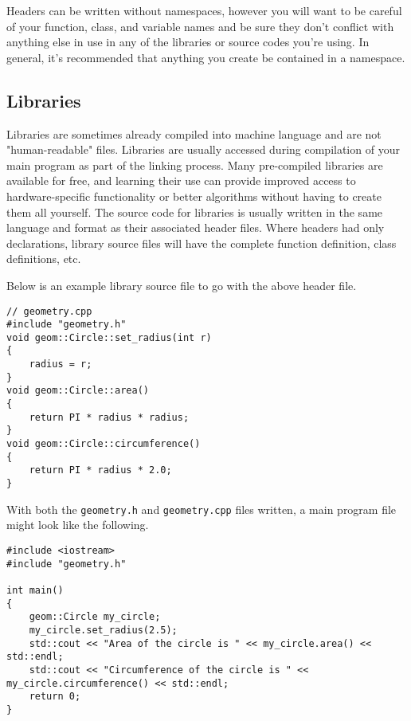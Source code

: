 Headers can be written without namespaces, however you will want to be careful of your function, class, and variable names and be sure they don't conflict with anything else in use in any of the libraries or source codes you're using.  In general, it's recommended that anything you create be contained in a namespace.

\subsection{Libraries}
Libraries are sometimes already compiled into machine language and are not "human-readable" files.  Libraries are usually accessed during compilation of your main program as part of the linking process.  Many pre-compiled libraries are available for free, and learning their use can provide improved access to hardware-specific functionality or better algorithms without having to create them all yourself.  The source code for libraries is usually written in the same language and format as their associated header files.  Where headers had only declarations, library source files will have the complete function definition, class definitions, etc.

Below is an example library source file to go with the above header file.

\begin{verbatim}
// geometry.cpp
#include "geometry.h"
void geom::Circle::set_radius(int r)
{
    radius = r;
}
void geom::Circle::area()
{
    return PI * radius * radius;
}
void geom::Circle::circumference()
{
    return PI * radius * 2.0;
}
\end{verbatim}

With both the \texttt{geometry.h} and \texttt{geometry.cpp} files written, a main program file might look like the following.

\begin{verbatim}
#include <iostream>
#include "geometry.h"

int main()
{
    geom::Circle my_circle;
    my_circle.set_radius(2.5);
    std::cout << "Area of the circle is " << my_circle.area() << std::endl;
    std::cout << "Circumference of the circle is " << my_circle.circumference() << std::endl;
    return 0;
}
\end{verbatim}
